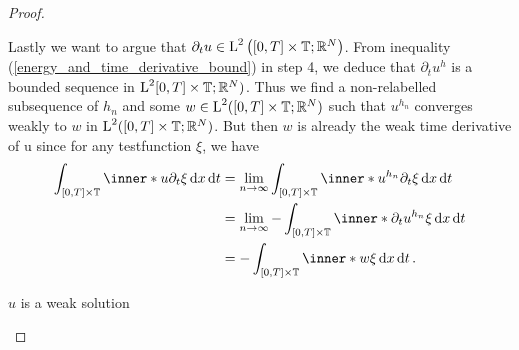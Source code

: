 \begin{proof}
\begin{description}[wide=0pt]
	Lastly we want to argue that $ \partial_{ t } u \in \operatorname{L}^{2 } \left( [ 0 , T ] \times \operatorname{\mathbb{T}} ; \mathbb{ R }^{ N } \right) $. From inequality (\ref{energy_and_time_derivative_bound}) in step 4, we deduce that $ \partial_{ t } u^{ h } $ is a bounded sequence in $ \operatorname{L}^{ 2 } [ 0 , T ] \times \operatorname{\mathbb{T}}; \mathbb{ R }^{ N } ) $. Thus we find a non-relabelled subsequence of $ h_{ n } $ and some $ w \in \operatorname{L}^{ 2 } ( [ 0 , T ] \times \operatorname{\mathbb{T}} ; \mathbb{ R }^{ N } ) $ such that $ u^{ h_{n } } $ converges weakly to $ w $ in $ \operatorname{L}^{ 2 } ( [0, T ] \times \operatorname{\mathbb{T}} ; \mathbb{ R }^{ N } ) $. But then $ w $ is already the weak time derivative of u since for any testfunction $ \xi $, we have
	\begin{align*}
		\int_{ [ 0 , T ] \times \flattorus }
			 \inner*{ u }{ \partial_{ t } \xi }
		\dd{ x } \dd{ t }
		& =
		\lim_{ n \to \infty }
			\int_{ [ 0 , T ] \times \flattorus }
				\inner*{ u^{ h_{ n } } }{ \partial_{ t } \xi }
			\dd{ x } \dd{ t }
		\\
		& =
		\lim_{n \to \infty }
			- \int_{ [ 0 , T ] \times \flattorus }
				\inner*{ \partial_{ t } u^{ h_{ n } } }{ \xi }
			\dd{ x }\dd{ t }
		\\
		& =
		- \int_{ [ 0 , T ] \times \flattorus }
			\inner*{ w }{ \xi }
		\dd{ x } \dd{ t }.
	\end{align*}

	\item[Step 7:] $ u $ is a weak solution
	

\end{description}
\end{proof}
